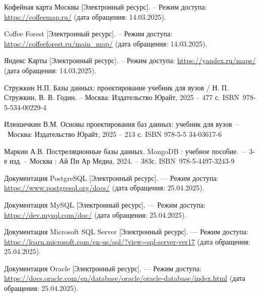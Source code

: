 
\renewcommand\bibname{\begin{center}
		\vspace{-15mm}
		\hspace{12.5mm}
		\large\bfseries{СПИСОК ИСПОЛЬЗОВАННЫХ ИСТОЧНИКОВ}
		\vspace{-10mm}
\end{center}
} 


\makeatletter
\renewcommand{\@biblabel}[1]{#1.    }
\makeatother


\begin{thebibliography}{}
	 Кофейная карта Москвы [Электронный ресурс]. -- Режим доступа: \url{https://coffeemap.ru/} (дата обращения: 14.03.2025).
	
	 Coffee Forest [Электронный ресурс]. -- Режим доступа: \url{https://coffeeforest.ru/main_map/} (дата обращения: 14.03.2025).
	
	 Яндекс Карты [Электронный ресурс]. -- Режим доступа: \url{https://yandex.ru/maps/} (дата обращения: 14.03.2025).

		
	
	
	 Стружкин Н.П. Базы данных: проектирование учебник для вузов / Н. П. Стружкин, В. В. Годин. -- Москва: Издательство Юрайт, 2025 -- 477 с. \mbox{ISBN 978-5-534-00229-4}

	 Илюшечкин В.М. Основы проектирования баз данных: учебник для \mbox{вузов -- Москва}: Издательство Юрайт, 2025 -- 213 с. ISBN 978-5-5 34-03617-6

	 Маркин А.В. Постреляционные базы данных. MongoDB : учебное \mbox{пособие. -- 3-е} изд. -- Москва : Ай Пи Ар Медиа, 2024. -- 383с. \mbox{ISBN 978-5-4497-3243-9}

	 Документация PostgreSQL [Электронный ресурс]. — Режим доступа: \url{https://www.postgresql.org/docs/} (дата обращения: 25.04.2025).

	
	 Документация MySQL [Электронный ресурс]. — Режим доступа: \url{https://dev.mysql.com/doc/} (дата обращения: 25.04.2025).
	
	 Документация Microsoft SQL Server [Электронный ресурс]. — Режим доступа: \url{https://learn.microsoft.com/en-us/sql/?view=sql-server-ver17} (дата обращения: 25.04.2025).
	
	 Документация Oracle [Электронный ресурс]. — Режим доступа: \url{https://docs.oracle.com/en/database/oracle/oracle-database/index.html} (дата обращения: 25.04.2025).
	


\end{thebibliography}
